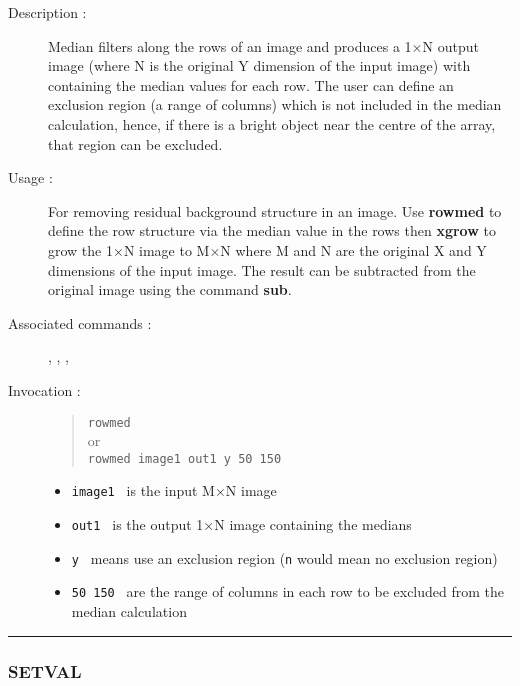 \begin{description}

\item[Description :] Median filters along the rows of an image and
produces a 1$\times$N output image (where N is the original Y dimension
of the input image) with containing the median values for each row.
The user can define an exclusion region (a range of columns) which is
not included in the median calculation, hence, if there is a bright
object near the centre of the array, that region can be excluded.

\item[Usage :] For removing residual background structure
in an image.  Use {\bf rowmed} to define the row structure via the
median value in the rows then {\bf xgrow} to grow the 1$\times$N image
to M$\times$N where M and N are the original X and Y dimensions of the
input image.  The result can be subtracted from the original image
using the command {\bf sub}.

\item[Associated commands :] {\tt {}}, 
{\tt {}}, {\tt {}}, 
{\tt {}}

\item[Invocation :]

\begin{quote}{\tt  rowmed }\\
or \\
{\tt rowmed image1 out1 y 50 150 }
\end{quote}

\begin{itemize}

\item {\tt image1 } is the input M$\times$N image
\item {\tt out1 } is the output 1$\times$N image containing the medians
\item {\tt y } means use an exclusion region ({\tt n} would mean no exclusion
 region)
\item {\tt 50 150 } are the range of columns in each row to be excluded
 from the median calculation
\end{itemize}

\end{description}

\hrule 
\subsubsection*{\label{SETVAL}SETVAL}

